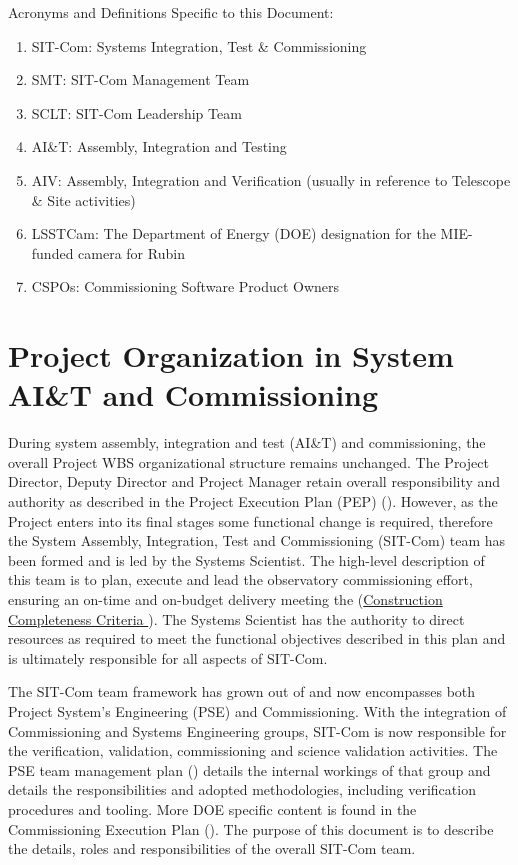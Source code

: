 \documentclass[SE,lsstdraft,authoryear,toc]{lsstdoc}
\begin{document}
Acronyms and Definitions Specific to this Document:
\begin{enumerate}
    \item SIT-Com: Systems Integration, Test \& Commissioning
    \item SMT: SIT-Com Management Team
    \item SCLT: SIT-Com Leadership Team
    \item AI\&T: Assembly, Integration and Testing
    \item AIV: Assembly, Integration and Verification (usually in reference to Telescope \& Site activities)
    \item LSSTCam: The Department of Energy (DOE) designation for the MIE-funded camera for Rubin
    \item CSPOs: Commissioning Software Product Owners
\end{enumerate}

\section{Project Organization in System AI\&T and Commissioning}
\label{sec:project_organization}

During system assembly, integration and test (AI\&T) and commissioning, the overall Project WBS organizational structure remains unchanged.
The Project Director, Deputy Director and Project Manager retain overall responsibility and authority as described in the Project Execution Plan (PEP) ().  However, as the Project enters into its final stages some functional change is required, therefore the System Assembly, Integration, Test and Commissioning (SIT-Com) team has been formed and is led by the Systems Scientist.  The high-level description of this team is to plan, execute and lead the observatory commissioning effort, ensuring an on-time and on-budget delivery meeting the (\href{https://sitcomtn-005.lsst.io}{Construction Completeness Criteria }).   The Systems Scientist has the authority to direct resources as required to meet the functional objectives described in this plan and is ultimately responsible for all aspects of SIT-Com.

The SIT-Com team framework has grown out of and now encompasses both Project System's Engineering (PSE) and Commissioning.  With the integration of Commissioning and Systems Engineering groups, SIT-Com is now responsible for the verification, validation, commissioning and science validation activities.  The PSE team management plan () details the internal workings of that group and details the responsibilities and adopted methodologies, including verification procedures and tooling.  More DOE specific content is found in the Commissioning Execution Plan ().  The purpose of this document is to describe the details, roles and responsibilities of the overall SIT-Com team.
\end{document}
